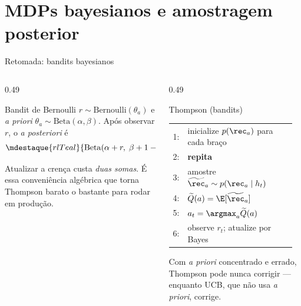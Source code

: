 \documentclass[aspectratio=169, 11pt]{beamer}
\makeatletter
\newcommand{\Qtil}{\widetilde{Q}}
\newcommand{\hist}{h_t}
\newcommand{\Bet}{\mathrm{Beta}}
\newcommand{\Ber}{\mathrm{Bernoulli}}
\newenvironment{pseudo}[1][0.93\linewidth]{%
  \small\setlength{\tabcolsep}{0pt}%
  \begin{tabular}{@{}r@{\hspace{0.55em}}p{#1}@{}}}%
  {\end{tabular}}
\newcommand{\pln}[1]{{\scriptsize\color{rlCinza}#1:}}
\newcommand{\ind}{\hspace*{1.1em}}
\makeatother
\begin{document}
\section{MDPs bayesianos e amostragem posterior}

\begin{frame}{Retomada: bandits bayesianos}
  \begin{columns}[T]
    \begin{column}{0.49\textwidth}
      \begin{defbox}{Bandit de Bernoulli}
        $r \sim \Ber(\theta_a)$ e \textit{a priori} $\theta_a \sim \Bet(\alpha,\beta)$.
        Após observar $r$, o \textit{a posteriori} é
        \[
          \mdestaque{rlTeal}{\Bet(\alpha + r,\; \beta + 1 - r)} .
        \]
      \end{defbox}
      \begin{ideiabox}
        Atualizar a crença custa \emph{duas somas}. É essa conveniência algébrica que
        torna Thompson barato o bastante para rodar em produção.
      \end{ideiabox}
    \end{column}
    \begin{column}{0.49\textwidth}
      \begin{algbox}{Thompson (bandits)}
        \begin{pseudo}
          \pln{1} & inicialize $p(\rec_a)$ para cada braço \\
          \pln{2} & \textbf{repita} \\
          \pln{3} & \ind amostre $\widetilde{\rec}_a \sim p(\rec_a \mid \hist)$ \\
          \pln{4} & \ind $\Qtil(a) = \E[\widetilde{\rec}_a]$ \\
          \pln{5} & \ind $a_t = \argmax_{a} \Qtil(a)$ \\
          \pln{6} & \ind observe $r_t$; atualize por Bayes
        \end{pseudo}
      \end{algbox}
      \begin{alertabox}
        Com \textit{a priori} concentrado e errado, Thompson pode nunca corrigir ---
        enquanto UCB, que não usa \textit{a priori}, corrige.
      \end{alertabox}
    \end{column}
  \end{columns}
\end{frame}
\end{document}
